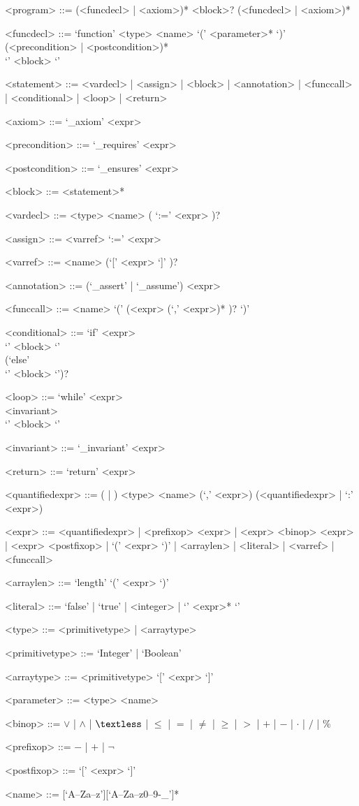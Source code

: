 \setlength{\grammarindent}{12em} %

\begin{grammar}

<program> ::= (<funcdecl> | <axiom>)* <block>? (<funcdecl> | <axiom>)*

<funcdecl> ::= `function' <type> <name> `(' <parameter>* `)' \\ (<precondition> | <postcondition>)* \\ `{' <block> `}'

<statement> ::= <vardecl> | <assign> | <block> | <annotation> | <funccall> | <conditional> | <loop> | <return>

<axiom> ::= `_axiom' <expr>

<precondition> ::= `_requires' <expr>

<postcondition> ::= `_ensures' <expr>

<block> ::= <statement>*

<vardecl> ::= <type> <name> ( `:=' <expr> )?

<assign> ::= <varref> `:=' <expr>

<varref> ::= <name> (`[' <expr> `]' )?

<annotation> ::= (`_assert' | `_assume') <expr>

<funccall> ::= <name> `(' (<expr> (`,' <expr>)* )? `)'

<conditional> ::= `if' <expr> \\ `{' <block> `}'  \\ (`else' \\ `{' <block> `}')?

<loop> ::= `while' <expr> \\ <invariant> \\ `{' <block> `}'

<invariant> ::= `_invariant' <expr>

<return> ::= `return' <expr>

<quantifiedexpr> ::= (\lit{$\forall$} | \lit{$\exists$} ) <type> <name> (`,' <expr>) (<quantifiedexpr> | `:' <expr>)

<expr> ::= <quantifiedexpr> | <prefixop> <expr> | <expr> <binop> <expr> | <expr> <postfixop> | `(' <expr> `)' | <arraylen> | <literal> | <varref> | <funccall>

<arraylen> ::= `length' `(' <expr> `)'

<literal> ::= `false' | `true' | <integer> | `{' <expr>* `}'

<type> ::= <primitivetype> | <arraytype>

<primitivetype> ::= `Integer' | `Boolean'

<arraytype> ::= <primitivetype> `[' <expr> `]'

<parameter> ::= <type> <name>

<binop> ::= $\vee$ | $\wedge$ | $\textless$ | $\leq$ | $=$ | $\neq$ | $\geq$ | $>$ | $+$ | $-$ | $\cdot$ | $/$ | $\%$

<prefixop> ::= $-$ | $+$ | $\neg$

<postfixop> ::= `[' <expr> `]'

<name> ::=  [`A--Za--z'][`A--Za--z0--9-\_']*

\end{grammar}


